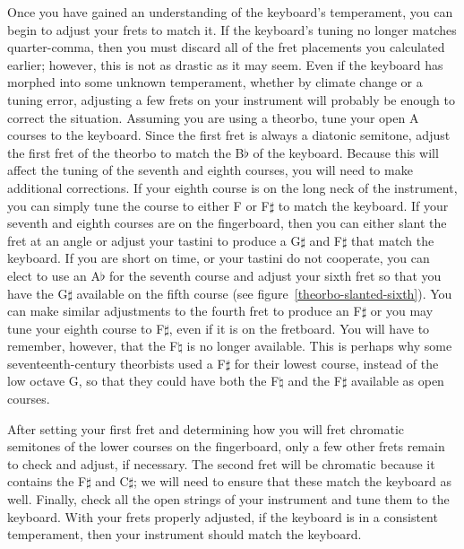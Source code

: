 Once you have gained an understanding of the keyboard's temperament, you can begin to adjust your
frets to match it.  If the keyboard's tuning no longer matches quarter-comma, then you must discard
all of the fret placements you calculated earlier; however, this is not as drastic as it may seem.
Even if the keyboard has morphed into some unknown temperament, whether by climate change or a
tuning error, adjusting a few frets on your instrument will probably be enough to correct the
situation.  Assuming you are using a theorbo, tune your open A courses to the keyboard.  Since the
first fret is always a diatonic semitone, adjust the first fret of the theorbo to match the B$\flat$
of the keyboard.  Because this will affect the tuning of the seventh and eighth courses, you will
need to make additional corrections.  If your eighth course is on the long neck of the instrument,
you can simply tune the course to either F or F$\sharp$ to match the keyboard.  If your seventh and
eighth courses are on the fingerboard, then you can either slant the fret at an angle or adjust your
tastini to produce a G$\sharp$ and F$\sharp$ that match the keyboard.  If you are short
on time, or your tastini do not cooperate, you can elect to use an A$\flat$ for the seventh course
and adjust your sixth fret so that you have the G$\sharp$ available on the fifth course (see
figure~\ref{theorbo-slanted-sixth}).  You can make similar adjustments to the fourth fret to produce
an F$\sharp$ or you may tune your eighth course to F$\sharp$, even if it is on the fretboard.  You
will have to remember, however, that the F$\natural$ is no longer available.  This is perhaps why
some seventeenth-century theorbists used a F$\sharp$ for their lowest course, instead of the low
octave G, so that they could have both the F$\natural$ and the F$\sharp$ available as open courses.

After setting your first fret and determining how you will fret chromatic semitones of the lower
courses on the fingerboard, only a few other frets remain to check and adjust, if necessary.  The
second fret will be chromatic because it contains the F$\sharp$ and C$\sharp$; we will need to
ensure that these match the keyboard as well. Finally, check all the open strings of your instrument
and tune them to the keyboard. With your frets properly adjusted, if the keyboard is in a consistent
temperament, then your instrument should match the keyboard.

